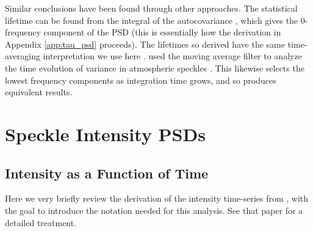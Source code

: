 \documentclass[10pt,preprint]{aastex631}
\begin{document}
Similar conclusions have been found through other approaches.  The statistical lifetime can be found from the integral of the autocovariance \citep{1986JOSAA...3.1001A}, which gives the 0-frequency component of the PSD (this is essentially how the derivation in Appendix \ref{app:tau_psd} proceeds).  The lifetimes so derived have the same time-averaging interpretation we use here \citep{2006ApJ...637..541F}.  \citet{2006OExpr..14.7499P} used the moving average filter to analyze the time evolution of variance in atmospheric speckles \citep[see also][]{2005SPIE.5903..170M}.  This likewise selects the lowest frequency components as integration time grows, and so produces equivalent results.

\section{Speckle Intensity PSDs}

\subsection{Intensity as a Function of Time}
Here we very briefly review the derivation of the intensity time-series from \citet{2018JATIS...4a9001M}, with the goal to introduce the notation needed for this analysis.  See that paper for a detailed treatment.

\end{document}
